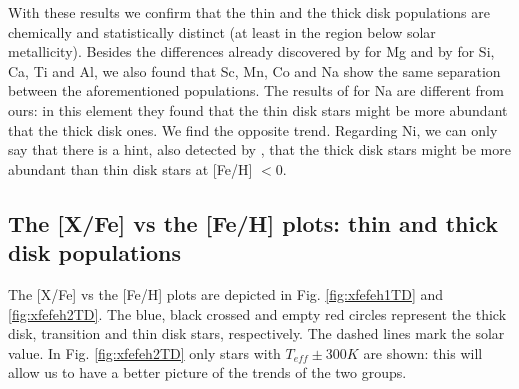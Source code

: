 \documentclass[oldversion]{aa}
\begin{document}
With these results we confirm that the thin and the thick disk populations are chemically and statistically distinct (at least in the region below solar metallicity). Besides the differences already discovered by \citet{Fuhrmann-1998} for Mg and by \citet{Bensby-2003} for Si, Ca, Ti and Al, we also found that Sc, Mn, Co and Na show the same separation between the aforementioned populations. The results of \citet{Bensby-2005} for Na are different from ours: in this element they found that the thin disk stars might be more abundant that the thick disk ones. We find the opposite trend. Regarding Ni, we can only say that there is a hint, also detected by \citet{Bensby-2003}, that the thick disk stars might be more abundant than thin disk stars at [Fe/H] $<0$. %

\subsection {The [X/Fe] vs the [Fe/H] plots: thin and thick disk populations}
\label{sec:xfefehTD}

The [X/Fe] vs the [Fe/H] plots are depicted in Fig. \ref{fig:xfefeh1TD} and \ref{fig:xfefeh2TD}. The blue, black crossed and empty red circles represent the thick disk, transition and thin disk stars, respectively. The dashed lines mark the solar value. In Fig. \ref{fig:xfefeh2TD} only stars with $T_{eff}\pm300 K$ are shown: this will allow us to have a better picture of the trends of the two groups.
\end{document}
